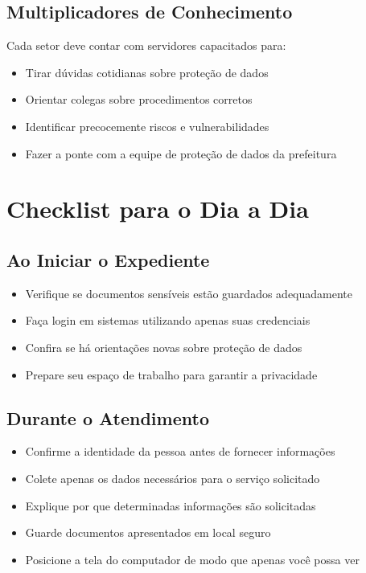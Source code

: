 \documentclass[12pt,a4paper]{article}
\begin{document}
\subsection{Multiplicadores de Conhecimento}
Cada setor deve contar com servidores capacitados para:
\begin{itemize}
    \item Tirar dúvidas cotidianas sobre proteção de dados
    \item Orientar colegas sobre procedimentos corretos
    \item Identificar precocemente riscos e vulnerabilidades
    \item Fazer a ponte com a equipe de proteção de dados da prefeitura
\end{itemize}

\newpage
\section{Checklist para o Dia a Dia}

\subsection{Ao Iniciar o Expediente}
\begin{itemize}
    \item Verifique se documentos sensíveis estão guardados adequadamente
    \item Faça login em sistemas utilizando apenas suas credenciais
    \item Confira se há orientações novas sobre proteção de dados
    \item Prepare seu espaço de trabalho para garantir a privacidade
\end{itemize}

\subsection{Durante o Atendimento}
\begin{itemize}
    \item Confirme a identidade da pessoa antes de fornecer informações
    \item Colete apenas os dados necessários para o serviço solicitado
    \item Explique por que determinadas informações são solicitadas
    \item Guarde documentos apresentados em local seguro
    \item Posicione a tela do computador de modo que apenas você possa ver
\end{itemize}
\end{document}
